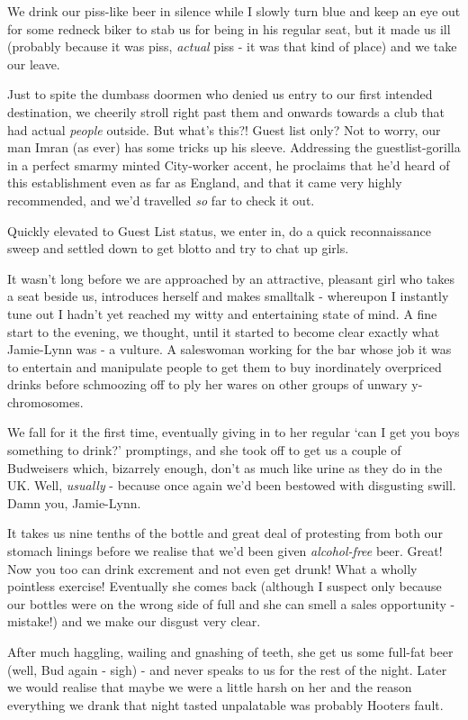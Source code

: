 \documentclass[a5paper,titlepage,11pt]{book}
\begin{document}
We drink our piss-like beer in silence while I slowly turn blue and keep an eye out for some redneck biker to stab us for being in his regular seat, but it made us ill (probably because it was piss, \emph{actual} piss - it was that kind of place) and we take our leave.

Just to spite the dumbass doormen who denied us entry to our first intended destination, we cheerily stroll right past them and onwards towards a club that had actual \emph{people} outside.  But what's this?!  Guest list only?  Not to worry, our man Imran (as ever) has some tricks up his sleeve.  Addressing the guestlist-gorilla in a perfect smarmy minted City-worker accent, he proclaims that he'd heard of this establishment even as far as England, and that it came very highly recommended, and we'd travelled \emph{so} far to check it out.

Quickly elevated to Guest List status, we enter in, do a quick reconnaissance sweep and settled down to get blotto and try to chat up girls.

It wasn't long before we are approached by an attractive, pleasant girl who takes a seat beside us, introduces herself and makes smalltalk - whereupon I instantly tune out I hadn't yet reached my witty and entertaining state of mind.  A fine start to the evening, we thought, until it started to become clear exactly what Jamie-Lynn was - a vulture.  A saleswoman working for the bar whose job it was to entertain and manipulate people to get them to buy inordinately overpriced drinks before schmoozing off to ply her wares on other groups of unwary y-chromosomes.

We fall for it the first time, eventually giving in to her regular `can I get you boys something to drink?' promptings, and she took off to get us a couple of Budweisers which, bizarrely enough, don't as much like urine as they do in the UK.  Well, \emph{usually} - because once again we'd been bestowed with disgusting swill.  Damn you, Jamie-Lynn.

It takes us nine tenths of the bottle and great deal of protesting from both our stomach linings before we realise that we'd been given \emph{alcohol-free} beer.  Great!  Now you too can drink excrement and not even get drunk!  What a wholly pointless exercise!  Eventually she comes back (although I suspect only because our bottles were on the wrong side of full and she can smell a sales opportunity - mistake!) and we make our disgust very clear.

After much haggling, wailing and gnashing of teeth, she get us some full-fat beer (well, Bud again - sigh) - and never speaks to us for the rest of the night.  Later we would realise that maybe we were a little harsh on her and the reason everything we drank that night tasted unpalatable was probably Hooters fault.
\end{document}
